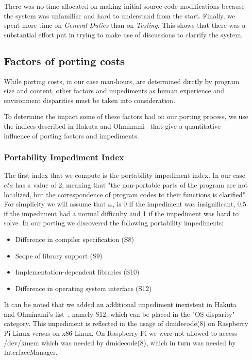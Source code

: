 There was no time allocated on making initial source code modifications because
the system was unfamiliar and hard to understand from the start. Finally, we
spent more time on \textit{General Duties} than on \textit{Testing}. This shows
that there was a substantial effort put in trying to make use of discussions
to clarrify the system.

\subsection{Factors of porting costs}

While porting costs, in our case man-hours, are determined dirctly by program
size and content, other factors and impediments as human experience and
environment disparities must be taken into consideration.

To determine the impact some of these factors had on our porting process, we
use the indices described in Hakuta and Ohminami~\cite{b2} that give
a quantitative influence of porting factors and impediments.

\subsubsection{Portability Impediment Index}

The first index that we compute is the portability impediment index. In our
case $eta$ has a value of 2, meaning that "the non-portable parts of the program
are not localized, but the correspondence of program codes to their functions is
clarified". For simplicity we will assume that $\omega_i$ is 0 if the impediment
was insignificant, 0.5 if the impediment had a normal difficulty and 1 if the
impediment was hard to solve. In our porting we discovered the following
portability impediments:
\begin{itemize}
    \item Difference in compiler specification (S8)
    \item Scope of library support (S9)
    \item Implementation-dependent libraries (S10)
    \item Difference in operating system interface (S12)
\end{itemize}

It can be noted that we added an additional impediment inexistent in Hakuta and
Ohminami's list~\cite{b2}, namely S12, which can be placed in the "OS disparity"
category. This impediment is reflected in the usage of dmidecode(8) on Raspberry
Pi Linux versus on x86 Linux. On Raspberry Pi we were not allowed to access
/dev/kmem which was needed by dmidecode(8), which in turn was needed by
InterfaceManager.

